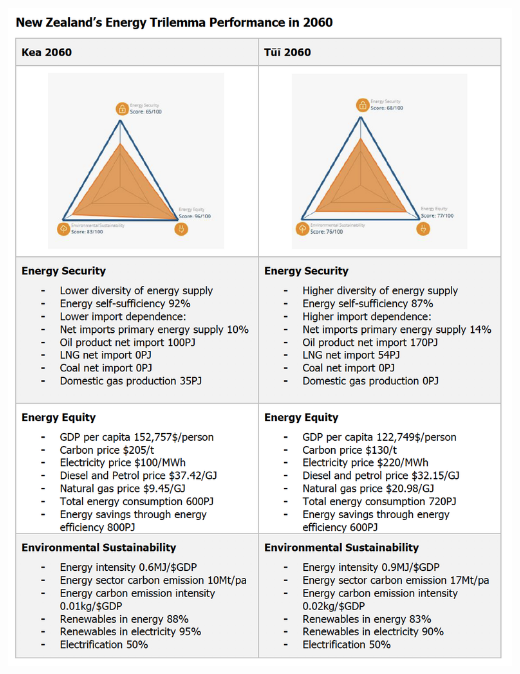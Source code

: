 \documentclass[12pt]{article}
\begin{document}
    \begin{center}
        \includegraphics[width=\textwidth]{NZTrilemma}
        \vspace{-1cm}
    \end{center}
\end{document}
